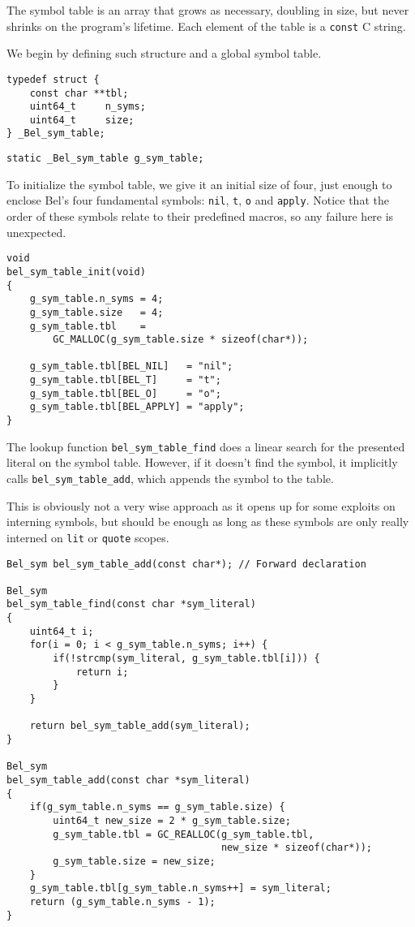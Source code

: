 \documentclass[openright,a4paper,twoside,12pt]{memoir}
\begin{document}
The symbol table is an array that grows as necessary, doubling in
size, but never shrinks on the program's lifetime. Each element of the
table is a \texttt{const} C string.

We begin by defining such structure and a global symbol table.

\begin{verbatim}
typedef struct {
    const char **tbl;
    uint64_t     n_syms;
    uint64_t     size;
} _Bel_sym_table;
\end{verbatim}

\begin{verbatim}
static _Bel_sym_table g_sym_table;
\end{verbatim}

To initialize the symbol table, we give it an initial size of four,
just enough to enclose Bel's four fundamental symbols: \texttt{nil}, \texttt{t}, \texttt{o} and
\texttt{apply}. Notice that the order of these symbols relate to their
predefined macros, so any failure here is unexpected.

\begin{verbatim}
void
bel_sym_table_init(void)
{
    g_sym_table.n_syms = 4;
    g_sym_table.size   = 4;
    g_sym_table.tbl    =
        GC_MALLOC(g_sym_table.size * sizeof(char*));

    g_sym_table.tbl[BEL_NIL]   = "nil";
    g_sym_table.tbl[BEL_T]     = "t";
    g_sym_table.tbl[BEL_O]     = "o";
    g_sym_table.tbl[BEL_APPLY] = "apply";
}
\end{verbatim}

The lookup function \texttt{bel\_sym\_table\_find} does a linear search for the
presented literal on the symbol table. However, if it doesn't find the
symbol, it implicitly calls \texttt{bel\_sym\_table\_add}, which appends the
symbol to the table.

This is obviously not a very wise approach as it opens up for some
exploits on interning symbols, but should be enough as long as these
symbols are only really interned on \texttt{lit} or \texttt{quote} scopes.

\begin{verbatim}
Bel_sym bel_sym_table_add(const char*); // Forward declaration

Bel_sym
bel_sym_table_find(const char *sym_literal)
{
    uint64_t i;
    for(i = 0; i < g_sym_table.n_syms; i++) {
        if(!strcmp(sym_literal, g_sym_table.tbl[i])) {
            return i;
        }
    }

    return bel_sym_table_add(sym_literal);
}

Bel_sym
bel_sym_table_add(const char *sym_literal)
{
    if(g_sym_table.n_syms == g_sym_table.size) {
        uint64_t new_size = 2 * g_sym_table.size;
        g_sym_table.tbl = GC_REALLOC(g_sym_table.tbl,
                                     new_size * sizeof(char*));
        g_sym_table.size = new_size;
    }
    g_sym_table.tbl[g_sym_table.n_syms++] = sym_literal;
    return (g_sym_table.n_syms - 1);
}
\end{verbatim}
\end{document}
